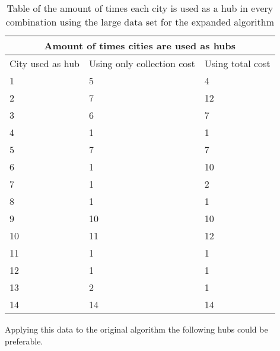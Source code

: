 \documentclass{article}
\begin{document}
             \begin{table}[h!]
                \begin{center}
                \begin{tabular}{|p{3cm}|p{3cm}|p{3cm}|}
                    \hline
                    \multicolumn{3}{|c|}{Amount of times cities are used as hubs} \\
                    \hline
                    City used as hub & Using only collection cost & Using total cost\\
                    \hline
                    1 &  5 & 4 \\
                    \hline
                    2 & 7   & 12 \\
                    \hline
                    3& 6 & 7\\
                    \hline
                    4  & 1 & 1 \\
                    \hline
                    5 & 7 & 7\\
                    \hline
                    6 & 1 & 10   \\
                    \hline
                    7 & 1& 2 \\
                    \hline
                    8 & 1 & 1 \\
                    \hline
                    9 &  10& 10 \\
                    \hline
                    10 & 11 & 12 \\
                    \hline
                    11 & 1& 1 \\
                    \hline
                    12 & 1 & 1 \\
                    \hline
                    13 & 2& 1 \\
                    \hline
                    14 & 14& 14 \\
                    \hline
                \end{tabular}
                \end{center}
                \caption{Table of the amount of times each city is used as a hub in every combination using the large data set for the expanded algorithm}
                \label{amount of times hubs are used in collection expanded algorithm} 
            \end{table}
            
            Applying this data to the original algorithm the following hubs could be preferable.
            
\end{document}
